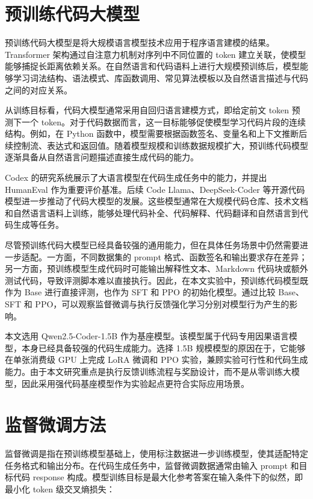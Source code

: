 \section{预训练代码大模型}

预训练代码大模型是将大规模语言模型技术应用于程序语言建模的结果。Transformer 架构通过自注意力机制对序列中不同位置的 token 建立关联，使模型能够捕捉长距离依赖关系\cite{Vaswani2017Attention}。在自然语言和代码语料上进行大规模预训练后，模型能够学习词法结构、语法模式、库函数调用、常见算法模板以及自然语言描述与代码之间的对应关系。

从训练目标看，代码大模型通常采用自回归语言建模方式，即给定前文 token 预测下一个 token。对于代码数据而言，这一目标能够促使模型学习代码片段的连续结构。例如，在 Python 函数中，模型需要根据函数签名、变量名和上下文推断后续控制流、表达式和返回值。随着模型规模和训练数据规模扩大，预训练代码模型逐渐具备从自然语言问题描述直接生成代码的能力。

Codex 的研究系统展示了大语言模型在代码生成任务中的能力，并提出 HumanEval 作为重要评价基准\cite{Chen2021Codex}。后续 Code Llama、DeepSeek-Coder 等开源代码模型进一步推动了代码大模型的发展\cite{Roziere2023CodeLlama,Guo2024DeepSeekCoder}。这些模型通常在大规模代码仓库、技术文档和自然语言语料上训练，能够处理代码补全、代码解释、代码翻译和自然语言到代码生成等任务。

尽管预训练代码大模型已经具备较强的通用能力，但在具体任务场景中仍然需要进一步适配。一方面，不同数据集的 prompt 格式、函数签名和输出要求存在差异；另一方面，预训练模型生成代码时可能输出解释性文本、Markdown 代码块或额外测试代码，导致评测脚本难以直接执行。因此，在本文实验中，预训练代码模型既作为 Base 进行直接评测，也作为 SFT 和 PPO 的初始化模型。通过比较 Base、SFT 和 PPO，可以观察监督微调与执行反馈强化学习分别对模型行为产生的影响。

本文选用 Qwen2.5-Coder-1.5B 作为基座模型。该模型属于代码专用因果语言模型，本身已经具备较强的代码生成能力。选择 1.5B 规模模型的原因在于，它能够在单张消费级 GPU 上完成 LoRA 微调和 PPO 实验，兼顾实验可行性和代码生成能力。由于本文研究重点是执行反馈训练流程与奖励设计，而不是从零训练大模型，因此采用强代码基座模型作为实验起点更符合实际应用场景。

\section{监督微调方法}

监督微调是指在预训练模型基础上，使用标注数据进一步训练模型，使其适配特定任务格式和输出分布。在代码生成任务中，监督微调数据通常由输入 prompt 和目标代码 response 构成。模型训练目标是最大化参考答案在输入条件下的似然，即最小化 token 级交叉熵损失：

